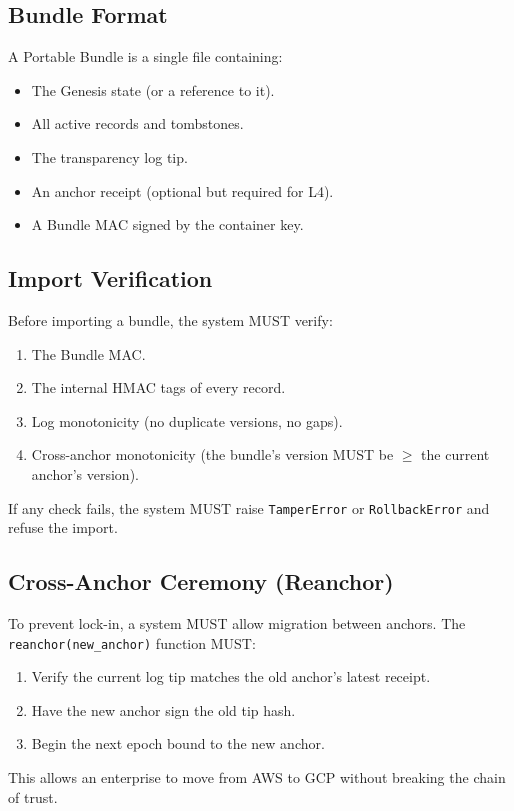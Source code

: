 \documentclass[11pt, a4paper]{article}
\begin{document}
\subsection{Bundle Format}
A Portable Bundle is a single file containing:
\begin{itemize}
    \item The Genesis state (or a reference to it).
    \item All active records and tombstones.
    \item The transparency log tip.
    \item An anchor receipt (optional but required for L4).
    \item A Bundle MAC signed by the container key.
\end{itemize}

\subsection{Import Verification}
Before importing a bundle, the system MUST verify:
\begin{enumerate}
    \item The Bundle MAC.
    \item The internal HMAC tags of every record.
    \item Log monotonicity (no duplicate versions, no gaps).
    \item Cross-anchor monotonicity (the bundle's version MUST be \(\ge\) the current anchor's version).
\end{enumerate}
If any check fails, the system MUST raise \texttt{TamperError} or \texttt{RollbackError} and refuse the import.

\subsection{Cross-Anchor Ceremony (Reanchor)}
To prevent lock-in, a system MUST allow migration between anchors. The \texttt{reanchor(new\_anchor)} function MUST:
\begin{enumerate}
    \item Verify the current log tip matches the old anchor's latest receipt.
    \item Have the new anchor sign the old tip hash.
    \item Begin the next epoch bound to the new anchor.
\end{enumerate}
This allows an enterprise to move from AWS to GCP without breaking the chain of trust.
\end{document}
